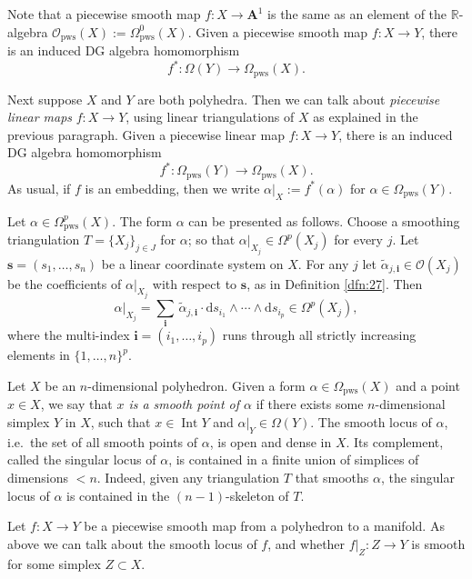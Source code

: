 \documentclass[10pt, a4paper]{amsart}
\theoremstyle{definition}
\numberwithin{equation}{section}
\newcommand{\opn}{\operatorname}
\newcommand{\mcal}[1]{\mathcal{#1}}
\newcommand{\mbf}[1]{\mathbf{#1}}
\newcommand{\mrm}[1]{\mathrm{#1}}
\newcommand{\mbb}[1]{\mathbb{#1}}
\newcommand{\bsym}[1]{\boldsymbol{#1}}
\newcommand{\til}[1]{\tilde{#1}}
\newcommand{\R}{\mbb{R}}
\renewcommand{\d}{\mrm{d}}
\begin{document}
Note that a piecewise smooth map $f : X \to \mbf{A}^1$ is
the same as an element of the $\R$-algebra
$\mcal{O}_{\mrm{pws}}(X) := \Omega^0_{\mrm{pws}}(X)$.
Given a piecewise smooth map $f : X \to Y$, there is an induced DG algebra
homomorphism
\[ f^* : \Omega(Y) \to \Omega_{\mrm{pws}}(X) . \]

Next suppose $X$ and $Y$ are both polyhedra. 
Then we can talk about {\em piecewise linear maps}
$f : X \to Y$, using linear triangulations of $X$ as explained in the previous
paragraph. Given a piecewise linear map $f : X \to Y$, there is an induced DG
algebra homomorphism
\[ f^* : \Omega_{\mrm{pws}}(Y) \to \Omega_{\mrm{pws}}(X) . \]
As usual, if $f$ is an embedding, then we write
$\alpha|_X := f^*(\alpha)$ for 
$\alpha \in \Omega_{\mrm{pws}}(Y)$.

Let $\alpha \in \Omega^p_{\mrm{pws}}(X)$.
The form $\alpha$ can be presented as follows. Choose a smoothing triangulation 
$T = \{ X_j \}_{j \in J}$ for $\alpha$; so that 
$\alpha|_{X_j} \in \Omega^p(X_j)$ for every $j$. Let
$\bsym{s} = (s_1, \ldots, s_n)$ be a linear coordinate system on $X$. For any 
$j$ let 
$\til{\alpha}_{j, \bsym{i}} \in \mcal{O}(X_j)$ be the coefficients of 
$\alpha|_{X_j}$ with respect to $\bsym{s}$, as in Definition \ref{dfn:27}.
Then
\begin{equation} \label{eqn:232}
\alpha|_{X_j} = \sum_{\bsym{i}} \, 
\til{\alpha}_{j, \bsym{i}} \cdot \d s_{i_1} \wedge \cdots \wedge \d s_{i_p} 
\in \Omega^p(X_j) , 
\end{equation}
where the multi-index 
$\bsym{i} = (i_1, \ldots, i_p)$ runs through all strictly increasing elements in
$\{ 1, \ldots, n \}^p$. 

Let $X$ be an $n$-dimensional polyhedron. Given a form
$\alpha \in \Omega_{\mrm{pws}}(X)$ and a point $x \in X$, we say that 
{\em $x$ is a smooth point of $\alpha$} if there exists some $n$-dimensional
simplex $Y$ in $X$, such that $x \in \opn{Int} Y$ and
$\alpha|_{Y} \in \Omega(Y)$.
The smooth locus of $\alpha$, i.e.\ the set of all smooth points of $\alpha$,
is open and dense in $X$. Its complement, called
the singular locus of $\alpha$, is contained in a finite union of simplices of
dimensions $< n$. Indeed, given any triangulation $T$ that smooths $\alpha$, the
singular locus of $\alpha$ is contained in the $(n-1)$-skeleton of $T$. 

Let $f : X \to Y$ be a 
piecewise smooth map from a polyhedron to a manifold. 
As above we can talk about the smooth locus of $f$, and whether 
$f|_Z : Z \to Y$ is smooth
for some simplex $Z \subset X$. 
\end{document}
